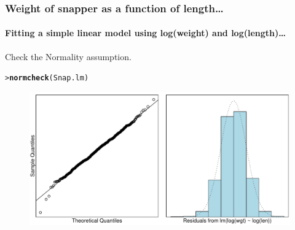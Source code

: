 \documentclass{beamer}\usepackage[]{graphicx}\usepackage[]{xcolor}
\makeatletter
\newcommand{\hlstd}[1]{\textcolor[rgb]{0.345,0.345,0.345}{#1}}%
\newcommand{\hlkwd}[1]{\textcolor[rgb]{0.737,0.353,0.396}{\textbf{#1}}}%
\newenvironment{kframe}{%
 \def\at@end@of@kframe{}%
 \ifinner\ifhmode%
  \def\at@end@of@kframe{\end{minipage}}%
  \begin{minipage}{\columnwidth}%
 \fi\fi%
 \def\FrameCommand##1{\hskip\@totalleftmargin \hskip-\fboxsep
 \colorbox{shadecolor}{##1}\hskip-\fboxsep
     \hskip-\linewidth \hskip-\@totalleftmargin \hskip\columnwidth}%
 \MakeFramed {\advance\hsize-\width
   \@totalleftmargin\z@ \linewidth\hsize
   \@setminipage}}%
 {\par\unskip\endMakeFramed%
 \at@end@of@kframe}
\newenvironment{knitrout}{}{} %
\makeatother
\begin{document}
\begin{frame}[fragile]
\frametitle{Weight of snapper as a function of length\ldots}
\framesubtitle{Fitting a simple linear model using log(weight) and log(length)\ldots}

Check the Normality assumption.
\begin{knitrout}\scriptsize
{}\color{fgcolor}\begin{kframe}
\begin{alltt}
\hlstd{> }\hlkwd{normcheck}\hlstd{(Snap.lm)}
\end{alltt}
\end{kframe}
\end{knitrout}



\begin{figure}
  \centering
  \includegraphics[scale=0.5]{figure/RC-H07-008}
\end{figure}

\end{frame}
\end{document}
